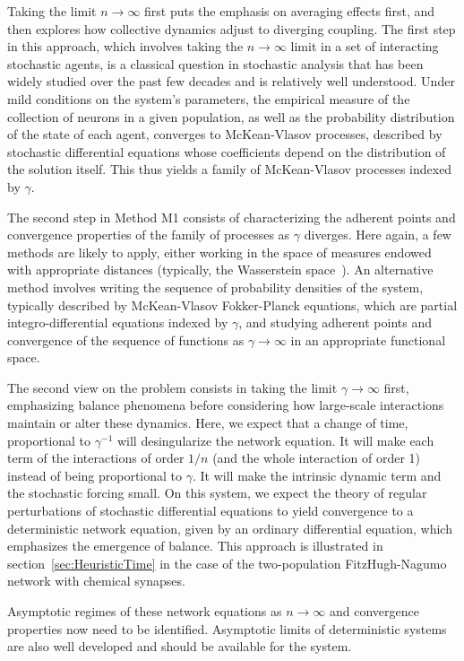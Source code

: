 \documentclass[onefignum,onetabnum]{siamart190516}
\newcommand{\1}{\mathbbm{1}}
\newcommand{\review}[1]{\textcolor{midblue}{ #1}}
\renewcommand{\review}[1]{{ #1}}
\begin{document}
\begin{enumerate}[(i)]\itemsep=2pt
\item[M1.a] \review{Taking the limit $n\to \infty$ first puts the emphasis on averaging effects first, and then explores how collective dynamics adjust to diverging coupling. The first step in this approach, which involves taking the $n\to\infty$ limit in a set of interacting stochastic agents, is a classical question in stochastic analysis that has been widely studied over the past few decades and is relatively well understood. Under mild conditions on the system's parameters, the empirical measure of the collection of neurons in a given population, as well as the probability distribution of the state of each agent, converges to McKean-Vlasov processes, described by stochastic differential equations whose coefficients depend on the distribution of the solution itself. This thus yields a family of McKean-Vlasov processes indexed by $\gamma$. 
\item [M1.b] The second step in Method M1 consists of characterizing the adherent points and convergence properties of the family of processes as $\gamma$ diverges. Here again, a few methods are likely to apply, either working in the space of measures endowed with appropriate distances (typically, the Wasserstein space~\cite{blaustein2023concentration,blaustein2023large,blaustein2024concentration}). An alternative method involves writing the sequence of probability densities of the system, typically described by McKean-Vlasov Fokker-Planck equations, which are partial integro-differential equations indexed by $\gamma$, and studying adherent points and convergence of the sequence of functions as $\gamma\to\infty$ in an appropriate functional space. }
\item[M2.a]  \review{The second view on the problem consists in taking the limit $\gamma\to\infty$ first, emphasizing balance phenomena before considering how large-scale interactions maintain or alter these dynamics. Here, we expect that a change of time, proportional to $\gamma^{-1}$ will desingularize the network equation. It will make each term of the interactions of order $1/n$ (and the whole interaction of order 1) instead of being proportional to $\gamma$. It will make the intrinsic dynamic term and the stochastic forcing small. On this system, we expect the theory of regular perturbations of stochastic differential equations to yield convergence to a deterministic network equation, given by an ordinary differential equation, which emphasizes the emergence of balance. This approach is illustrated in section~\ref{sec:HeuristicTime} in the case of the two-population FitzHugh-Nagumo network with chemical synapses. 
\item[M2.b] Asymptotic regimes of these network equations as $n\to \infty$ and convergence properties {now} need to be identified. Asymptotic limits of deterministic systems are also well developed and should be available for the system.}
\end{enumerate}
\end{document}
